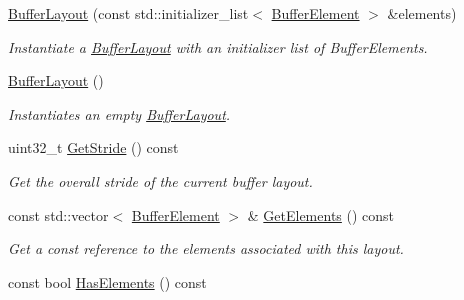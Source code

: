 \begin{DoxyCompactItemize}
\item 
\hyperlink{classengine_1_1renderer_1_1BufferLayout_aad7d69ca7a55c528fd619bc2f51635f0}{Buffer\+Layout} (const std\+::initializer\+\_\+list$<$ \hyperlink{structengine_1_1renderer_1_1BufferElement}{Buffer\+Element} $>$ \&elements)
\begin{DoxyCompactList}\small\item\em Instantiate a \hyperlink{classengine_1_1renderer_1_1BufferLayout}{Buffer\+Layout} with an initializer list of Buffer\+Elements. \end{DoxyCompactList}\item 
\mbox{\label{classengine_1_1renderer_1_1BufferLayout_ae2a3753096d6a8171179d6e9c86facb8}} 
\hyperlink{classengine_1_1renderer_1_1BufferLayout_ae2a3753096d6a8171179d6e9c86facb8}{Buffer\+Layout} ()
\begin{DoxyCompactList}\small\item\em Instantiates an empty \hyperlink{classengine_1_1renderer_1_1BufferLayout}{Buffer\+Layout}. \end{DoxyCompactList}\item 
uint32\+\_\+t \hyperlink{classengine_1_1renderer_1_1BufferLayout_abf525eed067da7cfa637c9fe795767b5}{Get\+Stride} () const
\begin{DoxyCompactList}\small\item\em Get the overall stride of the current buffer layout. \end{DoxyCompactList}\item 
\mbox{\label{classengine_1_1renderer_1_1BufferLayout_abdb110b3851f860c2d602d1b12a8568a}} 
const std\+::vector$<$ \hyperlink{structengine_1_1renderer_1_1BufferElement}{Buffer\+Element} $>$ \& \hyperlink{classengine_1_1renderer_1_1BufferLayout_abdb110b3851f860c2d602d1b12a8568a}{Get\+Elements} () const
\begin{DoxyCompactList}\small\item\em Get a const reference to the elements associated with this layout. \end{DoxyCompactList}\item 
\mbox{\label{classengine_1_1renderer_1_1BufferLayout_ae7abc90b970e0b028a9924fcb5bcf786}} 
const bool \hyperlink{classengine_1_1renderer_1_1BufferLayout_ae7abc90b970e0b028a9924fcb5bcf786}{Has\+Elements} () const

\end{DoxyCompactItemize}
